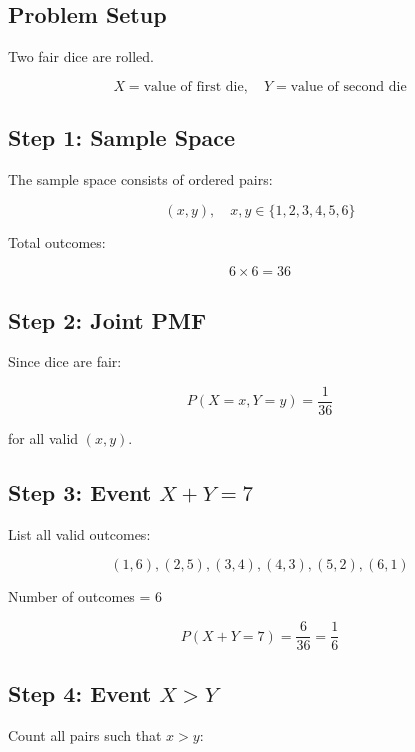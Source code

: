 \documentclass[11pt]{article}
\begin{document}
\subsection{Problem Setup}

Two fair dice are rolled.

\[
X = \text{value of first die}, \quad Y = \text{value of second die}
\]

\vspace{0.3cm}

\subsection{Step 1: Sample Space}

The sample space consists of ordered pairs:

\[
(x,y), \quad x,y \in \{1,2,3,4,5,6\}
\]

Total outcomes:

\[
6 \times 6 = 36
\]

\vspace{0.3cm}

\subsection{Step 2: Joint PMF}

Since dice are fair:

\[
P(X=x, Y=y) = \frac{1}{36}
\]

for all valid $(x,y)$.

\vspace{0.3cm}

\subsection{Step 3: Event $X + Y = 7$}

List all valid outcomes:

\[
(1,6), (2,5), (3,4), (4,3), (5,2), (6,1)
\]

Number of outcomes = 6

\[
P(X+Y=7) = \frac{6}{36} = \frac{1}{6}
\]

\vspace{0.3cm}

\subsection{Step 4: Event $X > Y$}

Count all pairs such that $x > y$:
\end{document}
